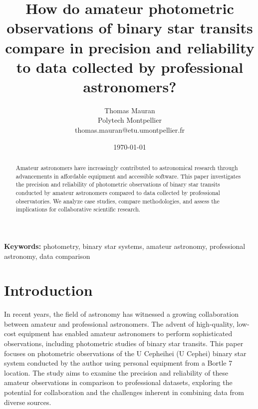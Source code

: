 \documentclass[12pt,a4paper]{article}
\title{How do amateur photometric observations of binary star transits compare in precision and reliability to data collected by professional astronomers?}
\author{Thomas Mauran \\\small Polytech Montpellier  \\\small thomas.mauran@etu.umontpellier.fr}
\date{\today}
\begin{document}
\maketitle

\begin{abstract}
Amateur astronomers have increasingly contributed to astronomical research through advancements in affordable equipment and accessible software. This paper investigates the precision and reliability of photometric observations of binary star transits conducted by amateur astronomers compared to data collected by professional observatories. We analyze case studies, compare methodologies, and assess the implications for collaborative scientific research.
\end{abstract}

\textbf{Keywords:} photometry, binary star systems, amateur astronomy, professional astronomy, data comparison

\section{Introduction}
In recent years, the field of astronomy has witnessed a growing collaboration between amateur and professional astronomers. The advent of high-quality, low-cost equipment has enabled amateur astronomers to perform sophisticated observations, including photometric studies of binary star transits. This paper focuses on photometric observations of the U Cepheihei (U Cephei) binary star system conducted by the author using personal equipment from a Bortle 7 location. The study aims to examine the precision and reliability of these amateur observations in comparison to professional datasets, exploring the potential for collaboration and the challenges inherent in combining data from diverse sources.

\end{document}
